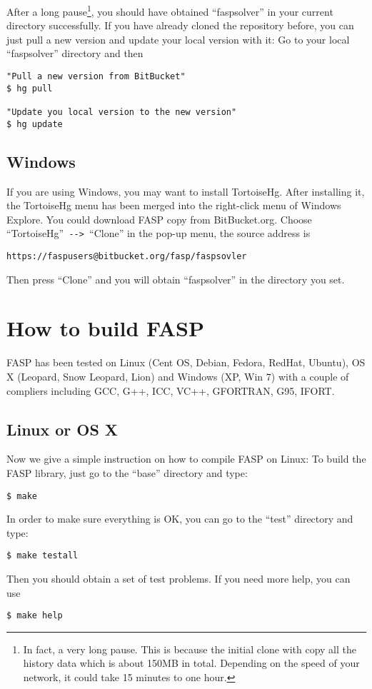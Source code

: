 \documentclass[11pt]{memoir}
\begin{document}
After a long pause\footnote{In fact, a very long pause. This is because the initial clone with copy all the history data which is about 150MB in total. Depending on the speed of your network, it could take 15 minutes to one hour.}, you should have obtained ``faspsolver'' in your current directory successfully. If you have already cloned the repository before, you can just pull a new version and update your local version with it: Go to your local ``faspsolver'' directory and then
%
\begin{lstlisting}[numbers=none]
"Pull a new version from BitBucket"
$ hg pull

"Update you local version to the new version"
$ hg update
\end{lstlisting}
%

\subsection{Windows}
If you are using Windows, you may want to install TortoiseHg. After installing it, the TortoiseHg menu has been merged into the right-click menu of Windows Explore. You could download FASP copy from BitBucket.org. Choose ``TortoiseHg''\verb| --> |``Clone'' in the pop-up menu, the source address is
\begin{lstlisting}[numbers=none]
https://faspusers@bitbucket.org/fasp/faspsovler
\end{lstlisting}
Then press ``Clone'' and you will obtain ``faspsolver'' in the directory you set.


\section{How to build FASP}\label{sec:build}

FASP has been tested on Linux (Cent OS, Debian, Fedora, RedHat, Ubuntu), OS X (Leopard, Snow Leopard, Lion) and Windows (XP, Win 7) with a couple of compliers including GCC, G++, ICC, VC++, GFORTRAN, G95, IFORT.

\subsection{Linux or OS X}

Now we give a simple instruction on how to compile FASP on Linux: To build the FASP library, just go to the ``base'' directory and type:
%
\begin{lstlisting}[numbers=none]
$ make
\end{lstlisting}
%
In order to make sure everything is OK, you can go to the ``test'' directory and type:
%
\begin{lstlisting}[numbers=none]
$ make testall
\end{lstlisting}
%
Then you should obtain a set of test problems. If you need more help, you can use
%
\begin{lstlisting}[numbers=none]
$ make help
\end{lstlisting}
\end{document}
